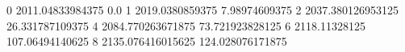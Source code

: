 0 2011.04833984375 0.0
1 2019.0380859375 7.98974609375
2 2037.380126953125 26.331787109375
4 2084.770263671875 73.721923828125
6 2118.11328125 107.06494140625
8 2135.076416015625 124.028076171875
